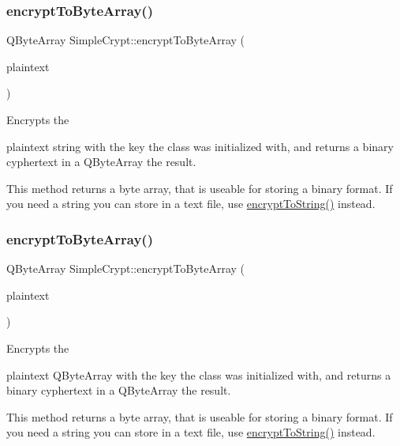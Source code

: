 \subsubsection{\texorpdfstring{encrypt\+To\+Byte\+Array()}{encryptToByteArray()}\hspace{0.1cm}{\footnotesize\ttfamily [1/2]}}
{\footnotesize\ttfamily Q\+Byte\+Array Simple\+Crypt\+::encrypt\+To\+Byte\+Array (\begin{DoxyParamCaption}\item[{const Q\+String \&}]{plaintext }\end{DoxyParamCaption})}

Encrypts the \begin{DoxyItemize}
\item plaintext string with the key the class was initialized with, and returns a binary cyphertext in a Q\+Byte\+Array the result.\end{DoxyItemize}
This method returns a byte array, that is useable for storing a binary format. If you need a string you can store in a text file, use \hyperlink{classSimpleCrypt_af26a3d3c6cef9732190c1d2c6a53a5b5}{encrypt\+To\+String()} instead. \mbox{\label{classSimpleCrypt_a741305d04e86bcb7d4625b05bf234887}} 
\subsubsection{\texorpdfstring{encrypt\+To\+Byte\+Array()}{encryptToByteArray()}\hspace{0.1cm}{\footnotesize\ttfamily [2/2]}}
{\footnotesize\ttfamily Q\+Byte\+Array Simple\+Crypt\+::encrypt\+To\+Byte\+Array (\begin{DoxyParamCaption}\item[{Q\+Byte\+Array}]{plaintext }\end{DoxyParamCaption})}

Encrypts the \begin{DoxyItemize}
\item plaintext Q\+Byte\+Array with the key the class was initialized with, and returns a binary cyphertext in a Q\+Byte\+Array the result.\end{DoxyItemize}
This method returns a byte array, that is useable for storing a binary format. If you need a string you can store in a text file, use \hyperlink{classSimpleCrypt_af26a3d3c6cef9732190c1d2c6a53a5b5}{encrypt\+To\+String()} instead. \mbox{\label{classSimpleCrypt_af26a3d3c6cef9732190c1d2c6a53a5b5}} 
